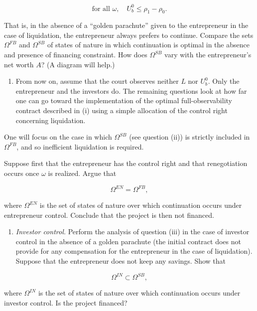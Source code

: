 \documentclass[11pt,a4paper]{article}
\providecommand{\tightlist}{\setlength{\itemsep}{0pt}\setlength{\parskip}{0pt}}
\begin{document}
\[\text{for all } \omega, \quad U_b^0 \leqslant \rho_1 - \rho_0.\]

That is, in the absence of a ``golden parachute'' given to the entrepreneur in the case of
liquidation, the entrepreneur always prefers to continue. Compare the sets \(\Omega^{FB}\) and
\(\Omega^{SB}\) of states of nature in which continuation is optimal in the absence and presence of
financing constraint. How does \(\Omega^{SB}\) vary with the entrepreneur's net worth \(A\)? (A
diagram will help.)

\begin{enumerate}
\def\labelenumi{(\roman{enumi})}
\setcounter{enumi}{2}
\tightlist
\item
  From now on, assume that the court observes neither \(L\) nor \(U_b^0\). Only the entrepreneur and
  the investors do. The remaining questions look at how far one can go toward the implementation of
  the optimal full-observability contract described in (i) using a simple allocation of the control
  right concerning liquidation.
\end{enumerate}

One will focus on the case in which \(\Omega^{SB}\) (see question (ii)) is strictly included in
\(\Omega^{FB}\), and so inefficient liquidation is required.

Suppose first that the entrepreneur has the control right and that renegotiation occurs once
\(\omega\) is realized. Argue that

\[\Omega^{EN} = \Omega^{FB},\]

where \(\Omega^{EN}\) is the set of states of nature over which continuation occurs under
entrepreneur control. Conclude that the project is then not financed.

\begin{enumerate}
\def\labelenumi{(\roman{enumi})}
\setcounter{enumi}{3}
\tightlist
\item
  \emph{Investor control.} Perform the analysis of question (iii) in the case of investor control in
  the absence of a golden parachute (the initial contract does not provide for any compensation for
  the entrepreneur in the case of liquidation). Suppose that the entrepreneur does not keep any
  savings. Show that
\end{enumerate}

\[\Omega^{IN} \subset \Omega^{SB},\]

where \(\Omega^{IN}\) is the set of states of nature over which continuation occurs under investor
control. Is the project financed?
\end{document}
